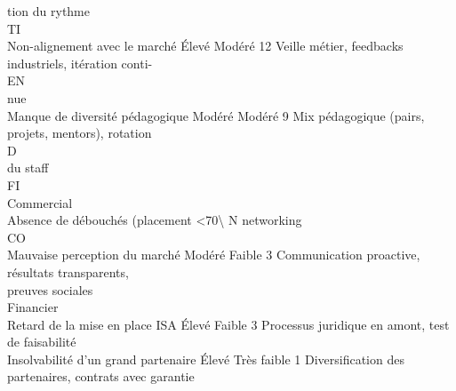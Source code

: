 \documentclass[12pt,landscape,a4paper]{article}
\begin{document}
tion du rythme\\
\vspace{0.5em}
\vspace{0.5em}
\vspace{0.5em}
\vspace{0.5em}
TI\\
Non-alignement avec le marché                         Élevé     Modéré        12   Veille métier, feedbacks industriels, itération conti-\\
\vspace{0.5em}
\vspace{0.5em}
\vspace{0.5em}
\vspace{0.5em}
EN\\
nue\\
Manque de diversité pédagogique                      Modéré     Modéré        9    Mix pédagogique (pairs, projets, mentors), rotation\\
\vspace{0.5em}
\vspace{0.5em}
\vspace{0.5em}
\vspace{0.5em}
D\\
du staff\\
\vspace{0.5em}
\vspace{0.5em}
\vspace{0.5em}
\vspace{0.5em}
FI\\
Commercial\\
Absence de débouchés (placement \textless{}70\textbackslash{}%
N                                  networking\\
CO\\
Mauvaise perception du marché                        Modéré     Faible        3    Communication proactive, résultats transparents,\\
preuves sociales\\
Financier\\
Retard de la mise en place ISA                        Élevé     Faible        3    Processus juridique en amont, test de faisabilité\\
Insolvabilité d’un grand partenaire                   Élevé   Très faible     1    Diversification des partenaires, contrats avec garantie\\
\end{document}
